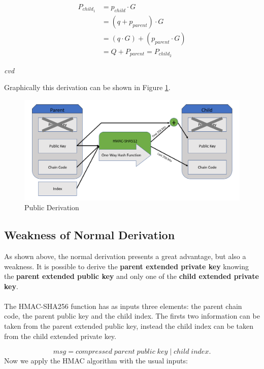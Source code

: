 \begin{equation*} \label{eq2}
\begin{split}
P_{child_1} & = p_{child} \cdot G \\
& = (q+p_{parent}) \cdot G \\
& = (q \cdot G) + (p_{parent}\cdot G) \\
& = Q + P_{parent} = P_{child_2}
\end{split}
\end{equation*}
\begin{flushright}
	\textit{cvd}
\end{flushright}
Graphically this derivation can be shown in Figure \ref{fig:pubtopub}.
\begin{figure}[ht!]
	\centering
	\includegraphics[width=14.5cm]{Figures/pubtopub.png} %
	\caption{Public Derivation}
	\label{fig:pubtopub}
\end{figure}

\subsection{Weakness of Normal Derivation}
As shown above, the normal derivation presents a great advantage, but also a weakness. It is possible to derive the \textbf{parent extended private key} knowing the \textbf{parent extended public key} and only one of the \textbf{child extended private key}.
\\ \\
The HMAC-SHA256 function has as inputs three elements: the parent chain code, the parent public key and the child index. The firsts two information can be taken from the parent extended public key, instead the child index can be taken from the child extended private key.

\begin{equation*}
msg = compressed \;parent\; public\;key \;|\;child\; index.
\end{equation*}
Now we apply the HMAC algorithm with the usual inputs:

